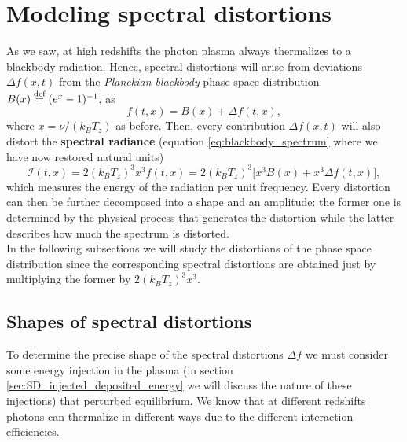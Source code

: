 \section{Modeling spectral distortions}
As we saw, at high redshifts the photon plasma always thermalizes to a blackbody radiation. Hence, spectral distortions will arise from deviations $\Delta f(x,t)$ from the \emph{Planckian blackbody} phase space distribution $B(x)\stackrel{\text{def}}{=}(e^x-1)^{-1}$, as$$f(t,x)=B(x)+\Delta f(t,x),$$ where $x=\nu/(k_BT_z)$ as before. Then, every contribution $\Delta f(x,t)$ will also distort the \textbf{spectral radiance} (equation \eqref{eq:blackbody_spectrum} where we have now restored natural units) $$\mathcal{I}(t,x)=2(k_BT_z)^3 x^3f(t,x)=2(k_BT_z)^3\big[x^3B(x)+x^3\Delta f(t,x)\big],$$ which measures the energy of the radiation per unit frequency. Every distortion can then be further decomposed into a shape and an amplitude: the former one is determined by the physical process that generates the distortion while the latter describes how much the spectrum is distorted.\\
In the following subsections we will study the distortions of the phase space distribution since the corresponding spectral distortions are obtained just by multiplying the former by $2(k_BT_z)^3x^3$.

\subsection{Shapes of spectral distortions}\label{sec:SD_shapes}
To determine the precise shape of the spectral distortions $\Delta f$ we must consider some energy injection in the plasma (in section \ref{sec:SD_injected_deposited_energy} we will discuss the nature of these injections) that perturbed equilibrium. We know that at different redshifts photons can thermalize in different ways due to the different interaction efficiencies. 
